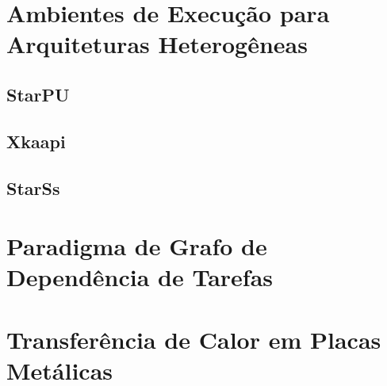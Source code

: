 \section{Ambientes de Execução para Arquiteturas Heterogêneas}
\subsection{StarPU}
\subsection{Xkaapi}
\subsection{StarSs}

\section{Paradigma de Grafo de Dependência de Tarefas}

\section{Transferência de Calor em Placas Metálicas}